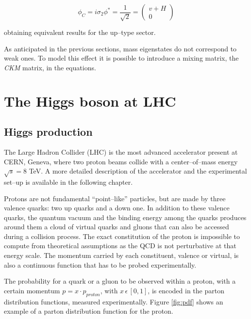 \begin{equation}
\phi_C = i \sigma_2 \phi^{\ast} = \frac{1}{\sqrt{2}}=\begin{pmatrix}
v+H\\ 
0
\end{pmatrix}
\end{equation}

obtaining equivalent results for the up--type sector.

As anticipated in the previous sections, mass eigenstates do not correspond to weak ones. To model this effect it is possible to introduce a mixing matrix, the \emph{CKM} matrix, in the equations. 

\section{The Higgs boson at LHC}

\subsection{Higgs production}

The Large Hadron Collider (LHC) is the most advanced accelerator present at CERN, Geneva, where two proton beams collide with a center--of--mass energy $\sqrt{s} = 8$ TeV. A more detailed description of the accelerator and the experimental set--up is available in the following chapter.

Protons are not fundamental ``point--like'' particles, but are made by three valence quarks: two up quarks and a down one. In addition to these valence quarks, the quantum vacuum and the binding energy among the quarks produces around them a cloud of virtual quarks and gluons that can also be accessed during a collision process. The exact constitution of the proton is impossible to compute from theoretical assumptions as the QCD is not perturbative at that energy scale. The momentum carried by each constituent, valence or virtual, is also a continuous function that has to be probed experimentally. 

The probability for a quark or a gluon to be observed within a proton, with a certain momentum $p = x \cdot p_{proton}$, with $x \, \epsilon \, [0,1]$, is encoded in the parton distribution functions, measured experimentally. Figure \ref{fig:pdf} shows an example of a parton distribution function for the proton.


